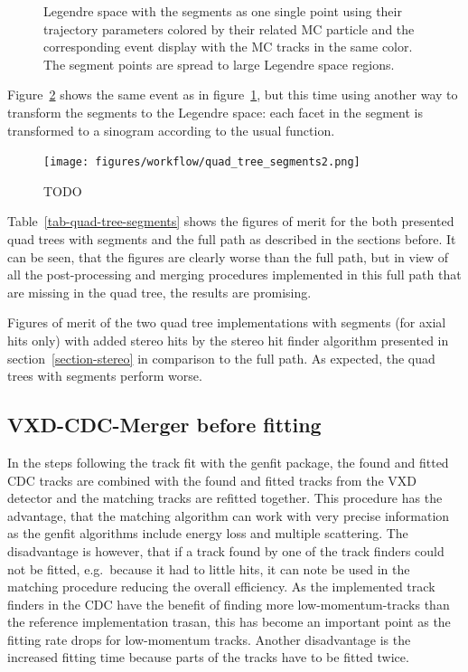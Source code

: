 \begin{figure}
\begin{minipage}{0.48\linewidth}
  \end{minipage}
  \caption{Legendre space with the segments as one single point using their trajectory parameters colored by their related MC particle and the corresponding event display with the MC tracks in the same color. The segment points are spread to large Legendre space regions.}
  \label{fig-quad-tree-segments}
\end{figure}

Figure~\ref{fig-quad-tree-hits} shows the same event as in figure~\ref{fig-quad-tree-segments}, but this time using another way to transform the segments to the Legendre space: each facet in the segment is transformed to a sinogram according to the usual function. 

\begin{figure}
  \centering
  \texttt{[image: figures/workflow/quad\_tree\_segments2.png]}
  \caption{TODO}
  \label{fig-quad-tree-hits}
\end{figure}

Table~\ref{tab-quad-tree-segments} shows the figures of merit for the both presented quad trees with segments and the full path as described in the sections before. It can be seen, that the figures are clearly worse than the full path, but in view of all the post-processing and merging procedures implemented in this full path that are missing in the quad tree, the results are promising.

\begin{table}
  \caption{Figures of merit of the two quad tree implementations with segments (for axial hits only) with added stereo hits by the stereo hit finder algorithm presented in section~\ref{section-stereo} in comparison to the full path. As expected, the quad trees with segments perform worse.}
  \label{tab-quad-tree-segments}
\end{table}

\subsection{VXD-CDC-Merger before fitting}
In the steps following the track fit with the genfit package, the found and fitted CDC tracks are combined with the found and fitted tracks from the VXD detector and the matching tracks are refitted together. This procedure has the advantage, that the matching algorithm can work with very precise information as the genfit algorithms include energy loss and multiple scattering. The disadvantage is however, that if a track found by one of the track finders could not be fitted, e.g.\ because it had to little hits, it can note be used in the matching procedure reducing the overall efficiency. As the implemented track finders in the CDC have the benefit of finding more low-momentum-tracks than the reference implementation trasan, this has become an important point as the fitting rate drops for low-momentum tracks. Another disadvantage is the increased fitting time because parts of the tracks have to be fitted twice.

